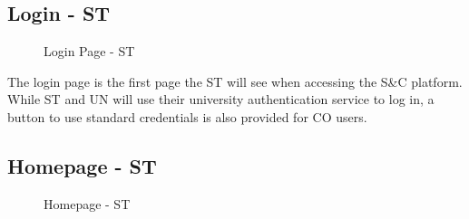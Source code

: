 \subsection{Login - ST}
\label{subsec:login-st}%

\begin{figure}[H]
    \centering
    \caption{Login Page - ST}
    \label{fig:login-page-st}
\end{figure}

\par The login page is the first page the ST will see when accessing the S\&C platform. While ST and UN will use their
university authentication service to log in, a button to use standard credentials is also provided for CO users.

\subsection{Homepage - ST}
\label{subsec:homepage-st}%

\begin{figure}[H]
    \centering
    \caption{Homepage - ST}
    \label{fig:homepage-st}
\end{figure}


